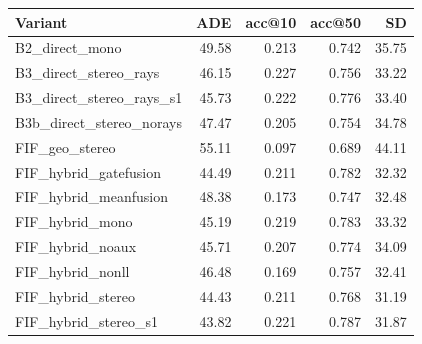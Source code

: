 \begin{tabular}{lrrrr}
\toprule
Variant & ADE & acc@10 & acc@50 & SD \\
\midrule
B2\_direct\_mono & 49.58 & 0.213 & 0.742 & 35.75 \\
B3\_direct\_stereo\_rays & 46.15 & 0.227 & 0.756 & 33.22 \\
B3\_direct\_stereo\_rays\_s1 & 45.73 & 0.222 & 0.776 & 33.40 \\
B3b\_direct\_stereo\_norays & 47.47 & 0.205 & 0.754 & 34.78 \\
FIF\_geo\_stereo & 55.11 & 0.097 & 0.689 & 44.11 \\
FIF\_hybrid\_gatefusion & 44.49 & 0.211 & 0.782 & 32.32 \\
FIF\_hybrid\_meanfusion & 48.38 & 0.173 & 0.747 & 32.48 \\
FIF\_hybrid\_mono & 45.19 & 0.219 & 0.783 & 33.32 \\
FIF\_hybrid\_noaux & 45.71 & 0.207 & 0.774 & 34.09 \\
FIF\_hybrid\_nonll & 46.48 & 0.169 & 0.757 & 32.41 \\
FIF\_hybrid\_stereo & 44.43 & 0.211 & 0.768 & 31.19 \\
FIF\_hybrid\_stereo\_s1 & 43.82 & 0.221 & 0.787 & 31.87 \\
\bottomrule
\end{tabular}
